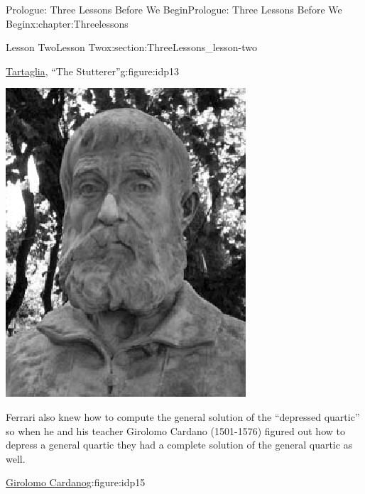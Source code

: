 \documentclass[oneside,10pt,]{book}
\numberwithin{equation}{section}
\begin{document}
\begin{chapterptx}{Prologue: Three Lessons Before We Begin}{}{Prologue: Three Lessons Before We Begin}{}{}{x:chapter:Threelessons}
\begin{sectionptx}{Lesson Two}{}{Lesson Two}{}{}{x:section:ThreeLessons_lesson-two}
\begin{figureptx}{\href{https://mathshistory.st-andrews.ac.uk/Biographies/Tartaglia/}{Tartaglia}\protect\footnotemark{}, ``The Stutterer''}{g:figure:idp13}{}
\begin{image}{0.36}{0.28}{0.36}
\includegraphics[width=\linewidth]{images/Tartaglia.png}
\end{image}%
\tcblower
\end{figureptx}%
%
Ferrari also knew how to compute the general solution of the ``depressed quartic'' so when he and his teacher Girolomo Cardano (1501-1576) figured out how to depress a general quartic they had a complete solution of the general quartic as well. \begin{figureptx}{\href{https://mathshistory.st-andrews.ac.uk/Biographies/Cardan}{Girolomo Cardano}\protect\footnotemark{}}{g:figure:idp15}{}%
\begin{image}{0.36}{0.28}{0.36}%

\end{image}
\end{figureptx}
\end{sectionptx}
\end{chapterptx}
\end{document}
